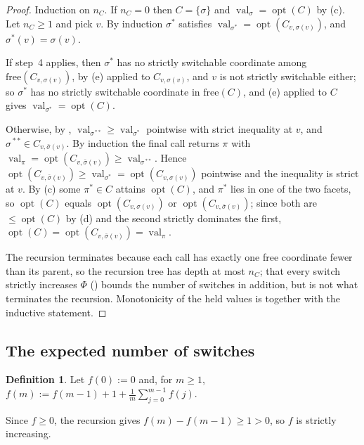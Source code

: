 \documentclass[11pt]{article}
\theoremstyle{plain}
\theoremstyle{definition}
\newtheorem{definition}[theorem]{Definition}
\DeclareMathOperator{\val}{val}
\DeclareMathOperator{\opt}{opt}
\begin{document}
\begin{proof}
Induction on $n_C$. If $n_C=0$ then $C=\{\sigma\}$ and
$\val_\sigma=\opt(C)$ by (c). Let $n_C\ge1$ and pick
$v$. By induction $\sigma^{\!*}$ satisfies
$\val_{\sigma^{\!*}}=\opt(C_{v,\sigma(v)})$, and
$\sigma^{\!*}(v)=\sigma(v)$.

If step~4 applies, then $\sigma^{\!*}$ has no strictly switchable
coordinate among $\mathrm{free}(C_{v,\sigma(v)})$, by
(e) applied to $C_{v,\sigma(v)}$, and $v$ is not
strictly switchable either; so $\sigma^{\!*}$ has no strictly switchable
coordinate in $\mathrm{free}(C)$, and (e) applied to
$C$ gives $\val_{\sigma^{\!*}}=\opt(C)$.

Otherwise, by , $\val_{\sigma^{\!**}}\ge\val_{\sigma^{\!*}}$
pointwise with strict inequality at $v$, and
$\sigma^{\!**}\in C_{v,\bar\sigma(v)}$. By induction the final call
returns $\pi$ with $\val_\pi=\opt(C_{v,\bar\sigma(v)})\ge\val_{\sigma^{\!**}}$.
Hence $\opt(C_{v,\bar\sigma(v)})\ge\val_{\sigma^{\!*}}=\opt(C_{v,\sigma(v)})$
pointwise and the inequality is strict at $v$. By
(c) some $\pi^{\!*}\in C$ attains $\opt(C)$, and
$\pi^{\!*}$ lies in one of the two facets, so $\opt(C)$ equals
$\opt(C_{v,\sigma(v)})$ or $\opt(C_{v,\bar\sigma(v)})$; since both are
$\le\opt(C)$ by (d) and the second strictly dominates
the first, $\opt(C)=\opt(C_{v,\bar\sigma(v)})=\val_\pi$.

The recursion terminates because each call has exactly one free
coordinate fewer than its parent, so the recursion tree has depth at most
$n_C$; that every switch strictly increases $\Phi$ ()
bounds the number of switches in addition, but is not what terminates the
recursion. Monotonicity of the held values is  together
with the inductive statement.
\end{proof}

\subsection{The expected number of switches}

\begin{definition}\label{def:frec}
Let $f(0):=0$ and, for $m\ge1$,
$f(m):=f(m-1)+1+\frac1m\sum_{j=0}^{m-1}f(j)$.
\end{definition}

Since $f\ge0$, the recursion gives $f(m)-f(m-1)\ge1>0$, so $f$ is
strictly increasing.
\end{document}
